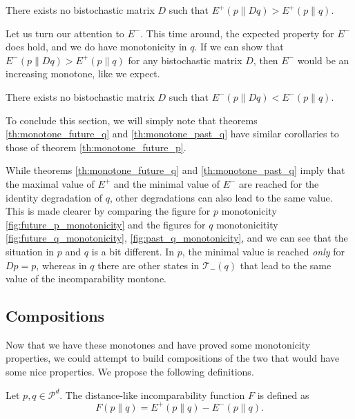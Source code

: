\begin{theorem} \label{th:monotone_future_q}
    There exists no bistochastic matrix $D$ such that $E^+ (p \parallel Dq) > E^+ (p \parallel q)$.
\end{theorem}

Let us turn our attention to $E^-$. This time around, the expected property for $E^-$ does hold, and we do have monotonicity in $q$. If we can show that $E^-(p \parallel Dq) > E^+(p \parallel q)$ for any bistochastic matrix $D$, then $E^-$ would be an increasing monotone, like we expect.

\begin{theorem} \label{th:monotone_past_q}
    There exists no bistochastic matrix $D$ such that $E^- (p \parallel Dq) < E^- (p \parallel q)$.
\end{theorem}

To conclude this section, we will simply note that theorems \ref{th:monotone_future_q} and \ref{th:monotone_past_q} have similar corollaries to those of theorem \ref{th:monotone_future_p}.

\begin{remark}
    While theorems \ref{th:monotone_future_q} and \ref{th:monotone_past_q} imply that the maximal value of $E^+$ and the minimal value of $E^-$ are reached for the identity degradation of $q$, other degradations can also lead to the same value. This is made clearer by comparing the figure for $p$ monotonicity \ref{fig:future_p_monotonicity} and the figures for $q$ monotonicitity \ref{fig:future_q_monotonicity}, \ref{fig:past_q_monotonicity}, and we can see that the situation in $p$ and $q$ is a bit different. In $p$, the minimal value is reached \textit{only} for $Dp = p$, whereas in $q$ there are other states in $\mathcal{T}_-(q)$ that lead to the same value of the incomparability montone. 
\end{remark}



\subsection{Compositions}

Now that we have these monotones and have proved some monotonicity properties, we could attempt to build compositions of the two that would have some nice properties. We propose the following definitions.

\begin{definition} \label{def:distance-like_function}
    Let $p, q \in \mathcal{P}^d$. The distance-like incomparability function $F$ is defined as 
    \begin{equation}
        F(p \parallel q) = E^+(p \parallel q) - E^-(p \parallel q).
    \end{equation}
\end{definition}

